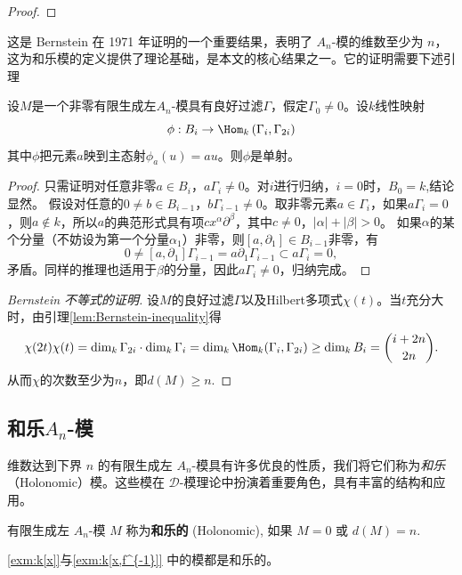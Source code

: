 \begin{example}
\begin{theorem}
\begin{proof}
    \end{proof}
\end{theorem}
这是 Bernstein 在 1971 年证明的一个重要结果，表明了 $A_n$-模的维数至少为 $n$，这为和乐模的定义提供了理论基础，是本文的核心结果之一。它的证明需要下述引理
\begin{lemma}
    \label{lem:Bernstein-inequality}
    设$M$是一个非零有限生成左$A_n$-模具有良好过滤$\Gamma$，假定$\Gamma_0\neq 0$。设$k$线性映射
    \begin{equation*}
        \phi:B_i \to \Hom_{k}\left( \Gamma_i,\Gamma_{2i} \right)
    \end{equation*}
    其中$\phi$把元素$a$映到主态射$\phi_a(u)=au$。则$\phi$是单射。
    \begin{proof}
        只需证明对任意非零$a\in B_i$，$a\Gamma_i\neq 0$。对$i$进行归纳，$i=0$时，$B_0=k$,结论显然。
        假设对任意的$0\neq b\in B_{i-1}$，$b\Gamma_{i-1}\neq 0$。取非零元素$a\in \Gamma_i$，如果$a\Gamma_i=0$，则$a\notin k$，所以$a$的典范形式具有项$cx^\alpha\partial^\beta$，其中$c\neq 0$，$\left|\alpha\right|+\left|\beta\right|>0$。
        如果$\alpha$的某个分量（不妨设为第一个分量$\alpha_1$）非零，则$[a,\partial_1]\in B_{i-1}$非零，有
        \begin{equation*}
            0\neq [a,\partial_1]\Gamma_{i-1}=a\partial_1\Gamma_{i-1}\subset a\Gamma_i=0,
        \end{equation*}
        矛盾。同样的推理也适用于$\beta$的分量，因此$a\Gamma_i\neq 0$，归纳完成。
    \end{proof}
\end{lemma}
\begin{proof}
    [Bernstein 不等式的证明]设$M$的良好过滤$\Gamma$以及Hilbert多项式$\chi(t)$。当$t$充分大时，由引理\ref{lem:Bernstein-inequality}得
    \begin{equation*}
        \chi(2t)\chi(t)
        =
        \dim_k \Gamma_{2i} \cdot \dim_k \Gamma_i
        = \dim_k \Hom_k(\Gamma_i,\Gamma_{2i})
        \geq \dim_k B_i
        = \binom{i+2n}{2n}.
    \end{equation*}
    从而$\chi$的次数至少为$n$，即$d(M)\geq n$.
\end{proof}


\subsection{和乐$A_n$-模}
维数达到下界 $n$ 的有限生成左 $A_n$-模具有许多优良的性质，我们将它们称为\emph{和乐}（Holonomic）模。这些模在 $\mathcal{D}$-模理论中扮演着重要角色，具有丰富的结构和应用。
\begin{definition}
    有限生成左 $A_n$-模 $M$
    称为\textbf{和乐的} (Holonomic),
    如果 $M=0$ 或 $d(M)=n$.
\end{definition}
\begin{example}
    \ref{exm:k[x]}与\ref{exm:k[x,f^{-1}]} 中的模都是和乐的。
\end{example}


\end{example}
